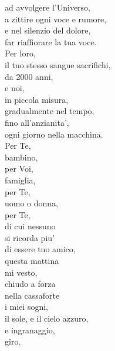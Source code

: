 \begin{haiku}
ad avvolgere l'Universo,\\
a zittire ogni voce e rumore,\\
e nel silenzio del dolore,\\
far riaffiorare la tua voce.\\
Per loro,\\
il tuo stesso sangue sacrifichi, \\
da 2000 anni,\\
e noi,\\
in piccola misura,\\
gradualmente nel tempo,\\
fino all'anzianita',\\
ogni giorno nella macchina.\\
Per Te,\\
bambino,\\
per Voi,\\
famiglia,\\
per Te,\\
uomo o donna,\\
per Te,\\
di cui nessuno\\
si ricorda piu'\\
di essere tuo amico,\\
questa mattina\\
mi vesto,\\
chiudo a forza\\
nella cassaforte\\
i miei sogni,\\
il sole, e il cielo azzuro,\\
e ingranaggio,\\
giro.\\
\end{haiku}
